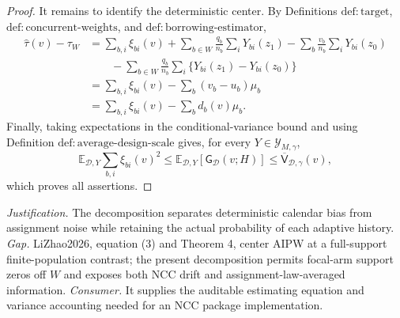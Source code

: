 \documentclass{article}
\begin{document}
\begin{proof}
It remains to identify the deterministic center.  By Definitions \(\mathrm{def:target}\), \(\mathrm{def:concurrent\text{-}weights}\), and \(\mathrm{def:borrowing\text{-}estimator}\),
\[
\begin{aligned}
\widehat\tau(v)-\tau_W
&=\sum_{b,i}\xi_{bi}(v)
+\sum_{b\in W}\frac{q_b}{n_b}\sum_iY_{bi}(z_1)
-\sum_b\frac{v_b}{n_b}\sum_iY_{bi}(z_0)\\
&\qquad-
\sum_{b\in W}\frac{q_b}{n_b}\sum_i
 \{Y_{bi}(z_1)-Y_{bi}(z_0)\}\\
&=\sum_{b,i}\xi_{bi}(v)-\sum_b(v_b-u_b)\mu_b\\
&=\sum_{b,i}\xi_{bi}(v)-\sum_bd_b(v)\mu_b.
\end{aligned}
\]
Finally, taking expectations in the conditional-variance bound and using Definition \(\mathrm{def:average\text{-}design\text{-}scale}\) gives, for every \(Y\in\mathcal Y_{M,\gamma}\),
\[
\mathbb E_{\mathcal D,Y}\sum_{b,i}\xi_{bi}(v)^2
\le \mathbb E_{\mathcal D,Y}[\mathsf G_{\mathcal D}(v;H)]
\le\overline{\mathsf V}_{\mathcal D,\gamma}(v),
\]
which proves all assertions.
\end{proof}
\par\smallskip\noindent \textit{Justification.} The decomposition separates deterministic calendar bias from assignment noise while retaining the actual probability of each adaptive history. \textit{Gap.} LiZhao2026, equation (3) and Theorem 4, center AIPW at a full-support finite-population contrast; the present decomposition permits focal-arm support zeros off \(W\) and exposes both NCC drift and assignment-law-averaged information. \textit{Consumer.} It supplies the auditable estimating equation and variance accounting needed for an NCC package implementation.
\end{document}
